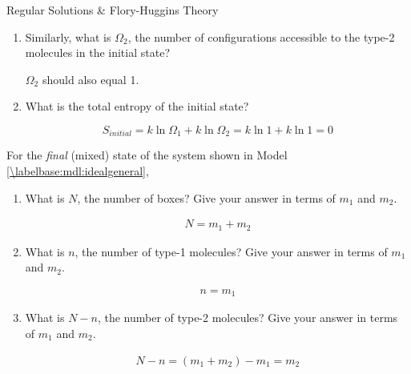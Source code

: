 \begin{activity}{Regular Solutions \& Flory-Huggins Theory}
\begin{ctqs}
\begin{enumerate}
				\item Similarly, what is $\Omega_2$, the number of configurations accessible to the type-2 molecules in the initial state?
				
					\begin{solution}[0.75in]
						$\Omega_2$ should also equal 1.
					\end{solution}
					
				\item What is the total entropy of the initial state?
					
					\begin{solution}[1in]
						\begin{equation*}
						S_{initial} = k \ln \Omega_1 + k \ln \Omega_2 = k \ln 1 + k \ln 1 = 0
						\end{equation*}
					\end{solution}
			\end{enumerate}
		
		\question For the \emph{final} (mixed) state of the system shown in Model \ref{\labelbase:mdl:idealgeneral},
		
			\begin{enumerate}
				\item What is $N$, the number of boxes?  Give your answer in terms of $m_1$ and $m_2$.
				
					\begin{solution}[0.5in]
						\begin{align*}
							N = m_1 + m_2
						\end{align*}
					\end{solution}
				
				\item What is $n$, the number of type-1 molecules?  Give your answer in terms of $m_1$ and $m_2$.
				
					\begin{solution}[0.5in]
						\begin{align*}
							n = m_1
						\end{align*}
					\end{solution}
				
				\item What is $N-n$, the number of type-2 molecules?  Give your answer in terms of $m_1$ and $m_2$.
				
					\begin{solution}[0.5in]
						\begin{align*}
							N-n = (m_1+m_2) - m_1 = m_2
						\end{align*}
					\end{solution}
					

\end{enumerate}
\end{ctqs}
\end{activity}
